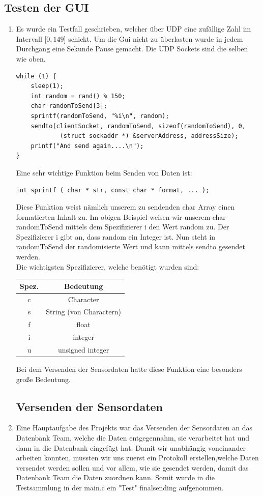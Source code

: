 \documentclass{article}
\begin{document}
\subsection{Testen der GUI}
\begin{enumerate}
\item[]Es wurde ein Testfall geschrieben, welcher über UDP eine zufällige Zahl im Intervall $\lbrack 0,149 \rbrack$ schickt. Um die Gui nicht zu überlasten wurde in jedem Durchgang eine Sekunde Pause gemacht. Die UDP Sockets sind die selben wie oben.
\begin{verbatim}
while (1) {
    sleep(1);
    int random = rand() % 150;
    char randomToSend[3];
    sprintf(randomToSend, "%i\n", random);
    sendto(clientSocket, randomToSend, sizeof(randomToSend), 0,
			(struct sockaddr *) &serverAddress, addressSize);
	printf("And send again....\n");
}
\end{verbatim}

Eine sehr wichtige Funktion beim Senden von Daten ist:
\begin{verbatim}
int sprintf ( char * str, const char * format, ... );
\end{verbatim}

Diese Funktion weist nämlich unserem zu sendenden char Array einen formatierten Inhalt zu.
Im obigen Beispiel weisen wir unserem char randomToSend mittels dem Spezifizierer i den Wert random zu. Der Spezifizierer i gibt an, dass random ein Integer ist. Nun steht in randomToSend der randomisierte Wert und kann mittels sendto gesendet werden.\\

Die wichtigsten Spezifizierer, welche benötigt wurden sind:\\

\begin{tabular}{|c|c|}
\hline
Spez. & Bedeutung\\
\hline
c & Character\\
s & String (von Charactern)\\
f & float\\
i & integer\\
u & unsigned integer\\
\hline
\end{tabular}

Bei dem Versenden der Sensordaten hatte diese Funktion eine besonders große Bedeutung.\\

\newpage

\subsection{Versenden der Sensordaten}
\item[]Eine Hauptaufgabe des Projekts war das Versenden der Sensordaten an das Datenbank Team, welche die Daten entgegennahm, sie verarbeitet hat und dann in die Datenbank eingefügt hat. Damit wir unabhängig voneinander arbeiten konnten, mussten wir uns zuerst ein Protokoll erstellen,welche Daten versendet werden sollen und vor allem, wie sie gesendet werden, damit das Datenbank Team die Daten zuordnen kann.
Somit wurde in die Testsammlung in der main.c ein "Test" finalsending aufgenommen.


\end{enumerate}
\end{document}
